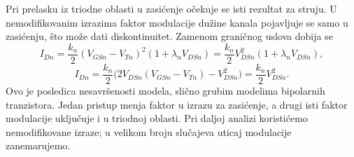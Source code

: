 Pri prelasku iz triodne oblasti u zasićenje očekuje se isti rezultat za struju. U nemodifikovanim izrazima faktor modulacije dužine kanala pojavljuje se samo u zasićenju, što može dati diskontinuitet. Zamenom graničnog uslova dobija se
\[I_{Dn}=\frac{k_n}{2}(V_{GSn}-V_{Tn})^2(1+\lambda_nV_{DSn})=\frac{k_n}{2}V_{DSn}^2(1+\lambda_nV_{DSn}),\]
\[I_{Dn}=\frac{k_n}{2}\bigl(2V_{DSn}(V_{GSn}-V_{Tn})-V_{DSn}^2\bigr)=\frac{k_n}{2}V_{DSn}^2.\]
Ovo je posledica nesavršenosti modela, slično grubim modelima bipolarnih tranzistora. Jedan pristup menja faktor u izrazu za zasićenje, a drugi isti faktor modulacije uključuje i u triodnoj oblasti. Pri daljoj analizi koristićemo nemodifikovane izraze; u velikom broju slučajeva uticaj modulacije zanemarujemo.


